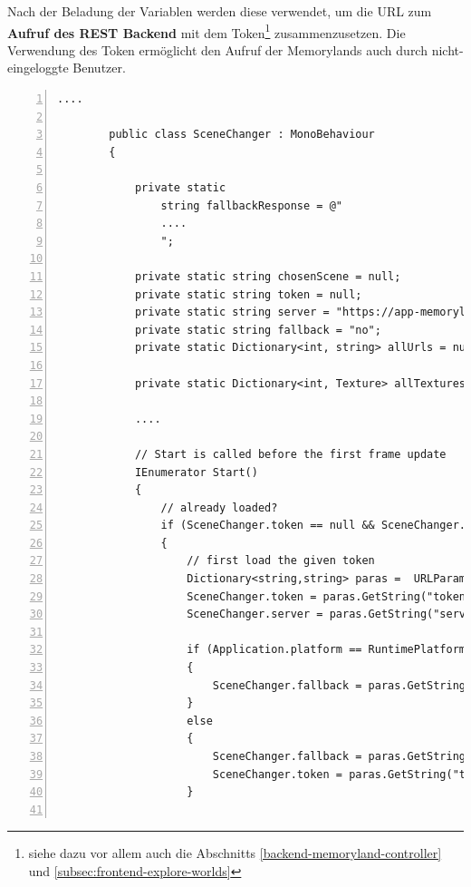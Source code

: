 Nach der Beladung der Variablen werden diese verwendet, um die URL zum \textbf{Aufruf des REST Backend} mit dem Token\footnote{siehe dazu vor allem auch die Abschnitts \ref{backend-memoryland-controller} und \ref{subsec:frontend-explore-worlds}} zusammenzusetzen. Die Verwendung des Token ermöglicht den Aufruf der Memorylands auch durch nicht-eingeloggte Benutzer.



\begin{lstlisting}[numbers=left,caption={SceneChanger - Start},label={lst:unity-scene-changer-start}]
        ....
        
        public class SceneChanger : MonoBehaviour
        {
        
            private static 
                string fallbackResponse = @"
                ....
                ";
        
            private static string chosenScene = null;
            private static string token = null;
            private static string server = "https://app-memoryland.azurewebsites.net";
            private static string fallback = "no";
            private static Dictionary<int, string> allUrls = null;
        
            private static Dictionary<int, Texture> allTextures = new Dictionary<int, Texture> ();
        
            ....                
        
            // Start is called before the first frame update
            IEnumerator Start()
            {
                // already loaded?
                if (SceneChanger.token == null && SceneChanger.chosenScene == null) 
                {
                    // first load the given token
                    Dictionary<string,string> paras =  URLParameters.GetSearchParameters();
                    SceneChanger.token = paras.GetString("token", "");
                    SceneChanger.server = paras.GetString("server", "https://app-memoryland.azurewebsites.net");
                    
                    if (Application.platform == RuntimePlatform.WebGLPlayer)
                    {
                        SceneChanger.fallback = paras.GetString("fallback", "no");
                    }
                    else
                    {
                        SceneChanger.fallback = paras.GetString("fallback", "no");
                        SceneChanger.token = paras.GetString("token", "1920cf9e-b295-4c80-b347-75eff21a71f6");
                    }
                    

\end{lstlisting}
